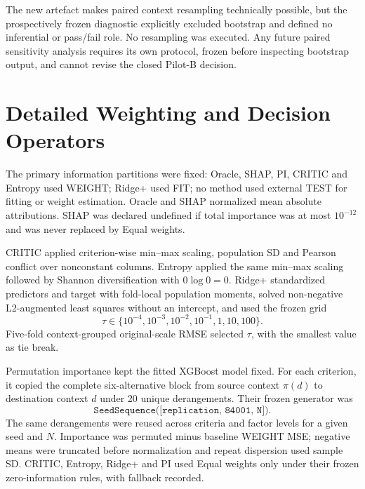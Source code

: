 \documentclass[runningheads]{llncs}
\begin{document}
The new artefact makes paired context resampling technically possible, but the prospectively
frozen diagnostic explicitly excluded bootstrap and defined no inferential or pass/fail role.
No resampling was executed. Any future paired sensitivity analysis requires its own protocol,
frozen before inspecting bootstrap output, and cannot revise the closed Pilot-B decision.

\section{Detailed Weighting and Decision Operators}

The primary information partitions were fixed: Oracle, SHAP, PI, CRITIC and Entropy used WEIGHT;
Ridge+ used FIT; no method used external TEST for fitting or weight estimation. Oracle and SHAP
normalized mean absolute attributions. SHAP was declared undefined if total importance was at
most $10^{-12}$ and was never replaced by Equal weights.

CRITIC applied criterion-wise min--max scaling, population SD and Pearson conflict over
nonconstant columns. Entropy applied the same min--max scaling followed by Shannon
diversification with $0\log0=0$. Ridge+ standardized predictors and target with fold-local
population moments, solved non-negative L2-augmented least squares without an intercept, and
used the frozen grid
\begin{equation}
\tau\in\{10^{-4},10^{-3},10^{-2},10^{-1},1,10,100\}.
\label{supp:eq:ridgegrid}
\end{equation}
Five-fold context-grouped original-scale RMSE selected $\tau$, with the smallest value as tie
break.

Permutation importance kept the fitted XGBoost model fixed. For each criterion, it copied the
complete six-alternative block from source context $\pi(d)$ to destination context $d$ under 20
unique derangements. Their frozen generator was
\begin{equation}
\texttt{SeedSequence([replication, 84001, N])}.
\label{supp:eq:piseedsequence}
\end{equation}
The same
derangements were reused across criteria and factor levels for a given seed and $N$. Importance
was permuted minus baseline WEIGHT MSE; negative means were truncated before normalization and
repeat dispersion used sample SD. CRITIC, Entropy, Ridge+ and PI used Equal weights only under
their frozen zero-information rules, with fallback recorded.
\end{document}
